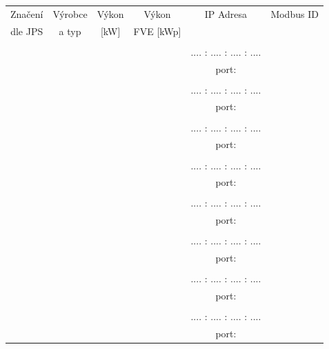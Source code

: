 {{        \vskip0.1in
        \begin{tabular}{||c|c|c|c|c|c||}
            \hline
            Značení& Výrobce & Výkon & Výkon & IP Adresa & Modbus ID\\
            dle JPS & a typ &[kW] & FVE [kWp] &  & \\
            \hline
            & & & & & \\
            & & & & .... : .... : .... : ....  & \\
            & & & & port: & \\
            \hline
            & & & & & \\
            & & & & .... : .... : .... : ....  & \\
            & & & & port: & \\
            \hline
            & & & & & \\
            & & & & .... : .... : .... : ....  & \\
            & & & & port: & \\
            \hline
            & & & & & \\
            & & & & .... : .... : .... : ....  & \\
            & & & & port: & \\
            \hline
            & & & & & \\
            & & & & .... : .... : .... : ....  & \\
            & & & & port: & \\
            \hline
            & & & & & \\
            & & & & .... : .... : .... : ....  & \\
            & & & & port: & \\
            \hline
            & & & & & \\
            & & & & .... : .... : .... : ....  & \\
            & & & & port: & \\
            \hline
            & & & & & \\
            & & & & .... : .... : .... : ....  & \\
            & & & & port: & \\
            \hline
        \end{tabular}
    }

    }
